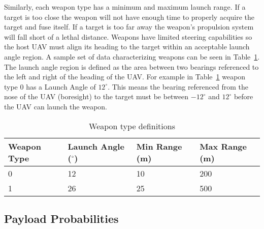 Similarly, each weapon type has a minimum and maximum launch range.  If a target is too close the weapon will not have enough time to properly acquire the target and fuse itself.  If a target is too far away the weapon's propulsion system will fall short of a lethal distance.  Weapons have limited steering capabilities so the host UAV must align its heading to the target within an acceptable launch angle region. A sample set of data characterizing weapons can be seen in Table~\ref{tab:weaponType}.  The launch angle region is defined as the area between two bearings referenced to the left and right of the heading of the UAV.  For example in Table~\ref{tab:weaponType} weapon type 0 has a Launch Angle of $12^{\circ}$.  This means the bearing referenced from the nose of the UAV (boresight) to the target must be between $-12^{\circ}$ and $12^{\circ}$ before the UAV can launch the weapon.


\begin{table}[H]
	\caption{Weapon type definitions}
	\centering
	\label{tab:weaponType}
	\begin{tabular}{|p{1.4cm}|p{1.6cm}|p{1.2cm}|p{1.2cm}|}
		\hline
		Weapon Type & Launch Angle ($^{\circ}$) & Min Range (m) & Max Range (m)\\ \hline
		0 & 12 & 10 & 200 \\ \hline
		1 & 26 & 25 & 500 \\ \hline
	\end{tabular}
\end{table}

\subsection{Payload Probabilities}
\label{sec:payload_probs}

